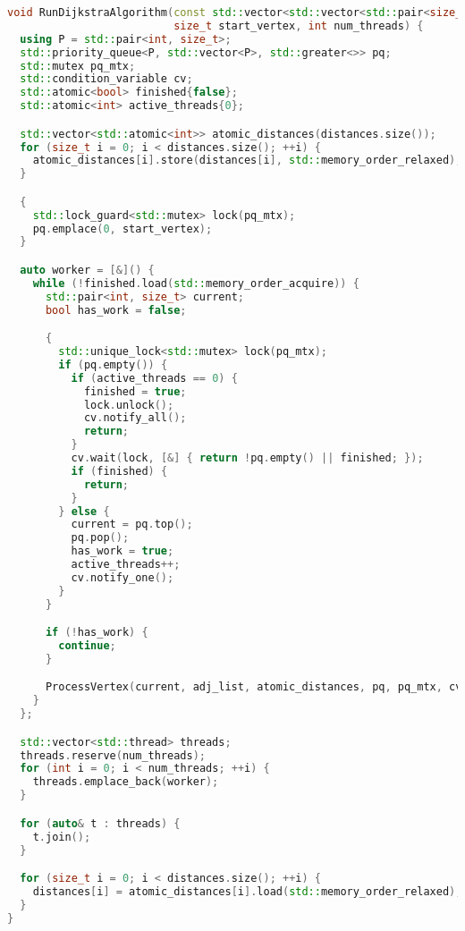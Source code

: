 \documentclass[12pt]{article}
\begin{document}
\begin{lstlisting}[language=C++]
void RunDijkstraAlgorithm(const std::vector<std::vector<std::pair<size_t, int>>>& adj_list, std::vector<int>& distances,
                          size_t start_vertex, int num_threads) {
  using P = std::pair<int, size_t>;
  std::priority_queue<P, std::vector<P>, std::greater<>> pq;
  std::mutex pq_mtx;
  std::condition_variable cv;
  std::atomic<bool> finished{false};
  std::atomic<int> active_threads{0};

  std::vector<std::atomic<int>> atomic_distances(distances.size());
  for (size_t i = 0; i < distances.size(); ++i) {
    atomic_distances[i].store(distances[i], std::memory_order_relaxed);
  }

  {
    std::lock_guard<std::mutex> lock(pq_mtx);
    pq.emplace(0, start_vertex);
  }

  auto worker = [&]() {
    while (!finished.load(std::memory_order_acquire)) {
      std::pair<int, size_t> current;
      bool has_work = false;

      {
        std::unique_lock<std::mutex> lock(pq_mtx);
        if (pq.empty()) {
          if (active_threads == 0) {
            finished = true;
            lock.unlock();
            cv.notify_all();
            return;
          }
          cv.wait(lock, [&] { return !pq.empty() || finished; });
          if (finished) {
            return;
          }
        } else {
          current = pq.top();
          pq.pop();
          has_work = true;
          active_threads++;
          cv.notify_one();
        }
      }

      if (!has_work) {
        continue;
      }

      ProcessVertex(current, adj_list, atomic_distances, pq, pq_mtx, cv, active_threads);
    }
  };

  std::vector<std::thread> threads;
  threads.reserve(num_threads);
  for (int i = 0; i < num_threads; ++i) {
    threads.emplace_back(worker);
  }

  for (auto& t : threads) {
    t.join();
  }

  for (size_t i = 0; i < distances.size(); ++i) {
    distances[i] = atomic_distances[i].load(std::memory_order_relaxed);
  }
}
\end{lstlisting}
\end{document}
